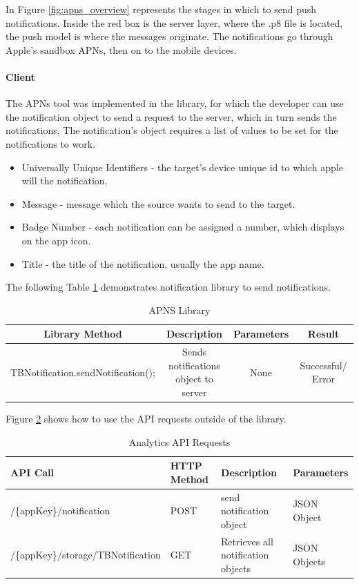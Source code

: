 In Figure \ref{fig:apns_overview} represents the stages in which to send push notifications. Inside the red box is the server layer, where the .p8 file is located, the push model is where the messages originate. The notifications go through Apple's sandbox APNs, then on to the mobile devices.

\paragraph{Client}

The APNs tool was implemented in the library, for which the developer can use the notification object to send a request to the server, which in turn sends the notifications. The notification's object requires a list of values to be set for the notifications to work.

\begin{itemize}
  \item Universally Unique Identifiers
  - the target's device unique id to which apple will the notification.
  \item Message
  - message which the source wants to send to the target.
  \item Badge Number
  - each notification can be assigned a number, which displays on the app icon.
  \item Title
  - the title of the notification, usually the app name.
\end{itemize}

The following Table \ref{table:mob_apns} demonstrates notification library to send notifications.

\begin{table}[!h]
\centering
\caption{APNS Library}
\label{table:mob_apns}
\begin{tabular}{|c|c|c|c|}
\hline
\rowcolor{green!20}
Library Method                    & Description                        & Parameters    & Result              \\ 
\hline
TBNotification.sendNotification();        & \makecell{Sends notifications\\ object to server} &  None & Successful/ Error   \\ 
\hline
\end{tabular}%
\end{table}

Figure \ref{table:apns} shows how to use the API requests outside of the library.

\begin{table}[!h]
\centering
\caption{Analytics API Requests}
\label{table:apns}
\begin{tabular}{|l|l|l|l|}
\hline
\rowcolor{green!20}
API Call                        & HTTP Method & Description                    & Parameters   \\ \hline
/\{appKey\}/notification & POST        & send notification object       & JSON Object  \\ \hline
/\{appKey\}/storage/TBNotification & GET         & Retrieves all notification objects & JSON Objects \\ \hline
\end{tabular}
\end{table}


